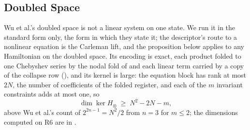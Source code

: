 \subsection{Doubled Space}
\label{sec:doubled-space}

Wu et al.'s doubled space is not a linear system on one state. We run it in the standard form only, the form in which they state it; the descriptor's route to a nonlinear equation is the Carleman lift, and the proposition below applies to any Hamiltonian on the doubled space. Its encoding is exact, each product folded to one Chebyshev series by the nodal fold of  and each linear term carried by a copy of the collapse row (), and its kernel is large: the equation block has rank at most $2N$, the number of coefficients of the folded register, and each of the $m$ invariant constraints adds at most one, so
\begin{equation}
    \dim\ker H_\otimes \;\ge\; N^2-2N-m,
    \label{eq:doubled-kernel}
\end{equation}
above Wu et al.'s count of $2^{2n-1}=N^2/2$ from $n=3$ for $m\le2$; the dimensions computed on R6 are in .

